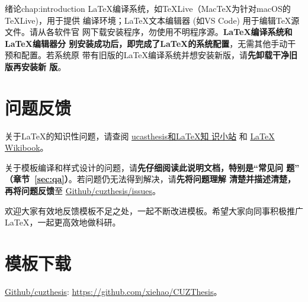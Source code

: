 \begin{cuzchapter}{绪论}{chap:introduction}
	\LaTeX{}编译系统，如\TeX{}Live（Mac\TeX{}为针对macOS的\TeX{}Live)，用于提供
	编译环境；\LaTeX{}文本编辑器 (如VS Code) 用于编辑\TeX{}源文件。请从各软件官
	网下载安装程序，勿使用不明程序源。\textbf{\LaTeX{}编译系统和\LaTeX{}编辑器分
	别安装成功后，即完成了\LaTeX{}的系统配置}，无需其他手动干预和配置。若系统原
	带有旧版的\LaTeX{}编译系统并想安装新版，请\textbf{先卸载干净旧版再安装新
	版}。

	\section{问题反馈}\label{sec:callback}

	关于\LaTeX{}的知识性问题，请查阅
	\href{https://github.com/mohuangrui/ucasthesis/wiki}{ucasthesis和\LaTeX{}知
	识小站} 和 \href{https://en.wikibooks.org/wiki/LaTeX}{\LaTeX{} Wikibook}。

	关于模板编译和样式设计的问题，请\textbf{先仔细阅读此说明文档，特别是“常见问
		题” （章节~\ref{sec:qa}）}。若问题仍无法得到解决，请\textbf{先将问题理解
		清楚并描述清楚，再将问题反馈}至
		\href{https://github.com/xiehao/CUZThesis/issues}{Github/cuzthesis/issues}。

	欢迎大家有效地反馈模板不足之处，一起不断改进模板。希望大家向同事积极推广
	\LaTeX{}，一起更高效地做科研。

	\section{模板下载}\label{sec:download}

	\begin{center}
		\href{https://github.com/xiehao/CUZThesis}{Github/cuzthesis}:
		\url{https://github.com/xiehao/CUZThesis}。
	\end{center}

\end{cuzchapter}